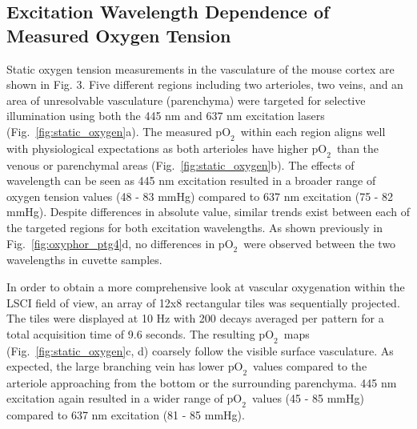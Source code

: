 \documentclass[12pt]{spieman}  %
\newcommand{\pO}{\ensuremath{\text{pO}_2}} 	            %
\begin{document}
\begin{spacing}{2}
\subsection{Excitation Wavelength Dependence of Measured Oxygen Tension}
Static oxygen tension measurements in the vasculature of the mouse cortex are shown in Fig. 3. Five different regions including two arterioles, two veins, and an area of unresolvable vasculature (parenchyma) were targeted for selective illumination using both the 445 nm and 637 nm excitation lasers (Fig.~\ref{fig:static_oxygen}a). The measured \pO\ within each region aligns well with physiological expectations as both arterioles have higher \pO\ than the venous or parenchymal areas (Fig.~\ref{fig:static_oxygen}b). The effects of wavelength can be seen as 445 nm excitation resulted in a broader range of oxygen tension values (48 - 83 mmHg) compared to 637 nm excitation (75 - 82 mmHg). Despite differences in absolute value, similar trends exist between each of the targeted regions for both excitation wavelengths. As shown previously in Fig.~\ref{fig:oxyphor_ptg4}d, no differences in \pO\ were observed between the two wavelengths in cuvette samples.

In order to obtain a more comprehensive look at vascular oxygenation within the LSCI field of view, an array of 12x8 rectangular tiles was sequentially projected. The tiles were displayed at 10 Hz with 200 decays averaged per pattern for a total acquisition time of 9.6 seconds. The resulting \pO\ maps (Fig.~\ref{fig:static_oxygen}c, d) coarsely follow the visible surface vasculature. As expected, the large branching vein has lower \pO\ values compared to the arteriole approaching from the bottom or the surrounding parenchyma. 445 nm excitation again resulted in a wider range of \pO\ values (45 - 85 mmHg) compared to 637 nm excitation (81 - 85 mmHg).


\end{spacing}
\end{document}

